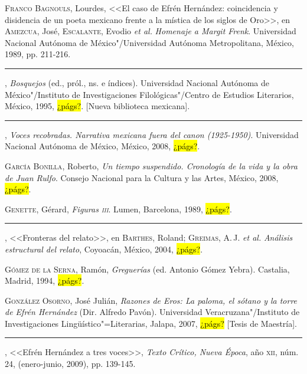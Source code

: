\documentclass[14pt,twoside,final]{extbook} %
\begin{document}
\textsc{Franco Bagnouls}, Lourdes, <<El caso de Efrén Hernández: coincidencia y disidencia de un poeta mexicano frente a la mística de los siglos de Oro>>, en \textsc{Amezcua}, José, \textsc{Escalante}, Evodio \emph{et al.} \emph{Homenaje a Margit Frenk}. Universidad Nacional Autónoma de México"/Universidad Autónoma Metropolitana, México, 1989, pp. 211-216.\label{bib:franco1989}

\rule{1cm}{0.4pt}, \emph{Bosquejos} (ed., pról., ns. e índices). Universidad Nacional Autónoma de México"/Instituto de Investigaciones Filológicas"/Centro de Estudios Literarios, México, 1995, \hl{¿págs?}. [Nueva biblioteca mexicana].\label{bib:franco1995}

\rule{1cm}{0.4pt}, \emph{Voces recobradas. Narrativa mexicana fuera del canon (1925-1950)}. Universidad Nacional Autónoma de México, México, 2008, \hl{¿págs?}.\label{bib:franco2008}

\textsc{García Bonilla}, Roberto, \emph{Un tiempo suspendido. Cronología de la vida y la obra de Juan Rulfo}. Consejo Nacional para la Cultura y las Artes, México, 2008, \hl{¿págs?}.\label{bib:garcia2008}

\textsc{Genette}, Gérard, \emph{Figuras \textsc{iii}}. Lumen, Barcelona, 1989, \hl{¿págs?}.\label{bib:genette1989}

\rule{1cm}{0.4pt}, <<Fronteras del relato>>, en \textsc{Barthes}, Roland; \textsc{Greimas}, A.\,J. \emph{et al.} \emph{Análisis estructural del relato}, Coyoacán,  México, 2004, \hl{¿págs?}.\label{bib:genette2004}

\textsc{Gómez de la Serna}, Ramón, \emph{Greguerías} (ed. Antonio Gómez Yebra). Castalia, Madrid, 1994, \hl{¿págs?}.\label{bib:gomez1994}

\textsc{González Osorno}, José Julián, \emph{Razones de Eros: \emph{La paloma, el sótano y la torre} de Efrén Hernández} (Dir. Alfredo Pavón). Universidad Veracruzana"/Instituto de Investigaciones Lingüístico"=Literarias, Jalapa, 2007, \hl{¿págs?} [Tesis de Maestría].\label{bib:gonzalez2007}

\rule{1cm}{0.4pt}, <<Efrén Hernández a tres voces>>, \emph{Texto Crítico, Nueva Época}, año \textsc{xii}, núm. 24, (enero-junio, 2009), pp. 139-145.\label{bib:gonzalez2009}
\end{document}
